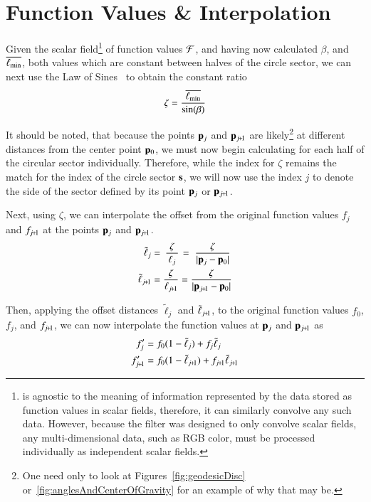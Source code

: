 \section{Function Values \& Interpolation}
\label{ch4sFVI}
Given the scalar field\footnote{ is agnostic to the meaning of information represented by the data stored as function values in scalar fields, therefore, it can similarly convolve any such data. However, because the filter was designed to only convolve scalar fields, any multi-dimensional data, such as RGB color, must be processed individually as independent scalar fields.} of function values $\mathcal{F}$, and having now calculated $\beta$, and $\overline{\ell_\text{min}}$, both values which are constant between halves of the circle sector, we can next use the Law of Sines~\cite{Weisstein19g} to obtain the constant ratio
%
\begin{equation}
	\zeta = \frac{\overline{\ell_\text{min}}}{\sin(\beta)}
	\label{eq:zeta}
\end{equation}%
%

It should be noted, that because the points $\mathbf{p}_j$ and $\bp_{\sjpo}$ are likely\footnote{One need only to look at Figures~\ref{fig:geodesicDisc} or~\ref{fig:anglesAndCenterOfGravity} for an example of why that may be.} at different distances from the center point $\mathbf{p}_0$, we must now begin calculating for each half of the circular sector individually. Therefore, while the index for $\zeta$ remains the match for the index of the circle sector $\mathbf{s}$, we will now use the index $j$ to denote the side of the sector defined by its point $\mathbf{p}_j$ or $\bp_{\sjpo}$.

Next, using $\zeta$, we can interpolate the offset from the original function values $f_j$ and $f_{\sjpo}$ at the points $\mathbf{p}_j$ and $\bp_{\sjpo}$.
\begin{align}
	\tilde{\ell}_j & = \kern2pt\frac{\zeta}{\kern2pt\ell_j\kern2pt}\kern1pt = \kern3pt\frac{\zeta}{|\bp_j - \bp_0|}
	\label{eq:distanceIForInterpolation}\\
	\tilde{\ell}_{\sjpo} & = \frac{\zeta}{\ell_{\sjpo}} = \frac{\zeta}{|\bp_{\sjpo} - \bp_0|}
	\label{eq:distanceIp1ForInterpolation}
\end{align}%
%

Then, applying the offset distances $\tilde{\ell}_j$ and $\tilde{\ell}_{\sjpo}$, to the original function values $f_0$, $f_j$, and $f_{\sjpo}$, we can now interpolate the function values at $\mathbf{p}_j$ and $\bp_{\sjpo}$ as
\begin{align}
	f'_j & = f_0(1 - \tilde{\ell}_j) + f_j\tilde{\ell}_j
	\label{eq:interpolatedFi} \\
	f'_{\sjpo} & = f_0(1 - \tilde{\ell}_{\sjpo}) + f_{\sjpo}\tilde{\ell}_{\sjpo}
	\label{eq:interpolatedFip1}
\end{align}%
%

